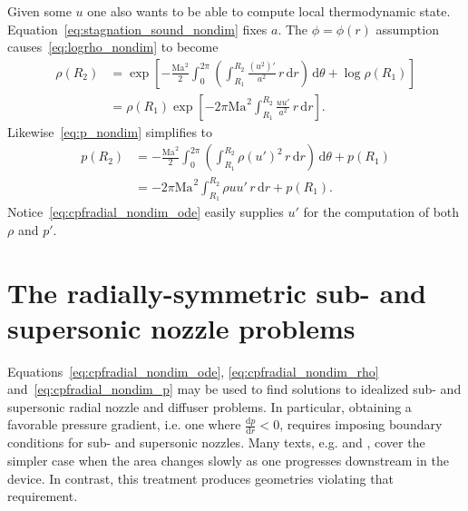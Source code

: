\documentclass[letterpaper,11pt,nointlimits,reqno]{amsart}
\newcommand{\Mach}[1][]{\ensuremath{\mbox{Ma}_{#1}}}
\begin{document}
Given some $u$ one also wants to be able to compute local thermodynamic state.
Equation~\eqref{eq:stagnation_sound_nondim} fixes $a$.  The $\phi=\phi(r)$
assumption causes~\eqref{eq:logrho_nondim} to become
\begin{align}
  \rho\!\left(R_2\right)
  &=
  \exp\left[
    - \frac{\Mach^2}{2} \int_{0}^{2\pi} \left( \int_{R_1}^{R_2}
        \frac{\left(u^2\right)'}{a^2}
      \, r \, \mathrm{d}r \right) \, \mathrm{d}\theta
    + \log\rho\!\left(R_1\right)
  \right]
\\
  &=
  \rho\!\left(R_1\right) \exp\left[
    - 2\pi\Mach^2 \int_{R_1}^{R_2}
        \frac{u u'}{a^2}
      \, r \, \mathrm{d}r
  \right]
\label{eq:cpfradial_nondim_rho}
.
\end{align}
Likewise~\eqref{eq:p_nondim} simplifies to
\begin{align}
  p\!\left(R_2\right)
  &=
    - \frac{\Mach^2}{2} \int_{0}^{2\pi} \left( \int_{R_1}^{R_2}
        \rho \left(u'\right)^2
      \, r \, \mathrm{d}r \right) \, \mathrm{d}\theta
    + p\!\left(R_1\right)
\\
  &=
    -2\pi\Mach^2 \int_{R_1}^{R_2} \rho u u' \, r \, \mathrm{d}r
      + p\!\left(R_1\right)
\label{eq:cpfradial_nondim_p}
.
\end{align}
Notice~\eqref{eq:cpfradial_nondim_ode} easily supplies $u'$ for the computation
of both $\rho$ and $p'$.

\section{The radially-symmetric sub- and supersonic nozzle problems}

Equations~\eqref{eq:cpfradial_nondim_ode}, \eqref{eq:cpfradial_nondim_rho}
and~\eqref{eq:cpfradial_nondim_p} may be used to find solutions to idealized
sub- and supersonic radial nozzle and diffuser problems.  In particular,
obtaining a favorable pressure gradient, i.e. one where
$\frac{\mathrm{d}p}{\mathrm{d}r} < 0$, requires imposing boundary conditions
for sub- and supersonic nozzles.  Many texts, e.g.
\citet[\textsection{}9.4]{White1999Fluid} and
\citet[\textsection{}97]{Landau2004Fluid}, cover the simpler case when the area
changes slowly as one progresses downstream in the device.  In contrast, this
treatment produces geometries violating that requirement.
\end{document}
